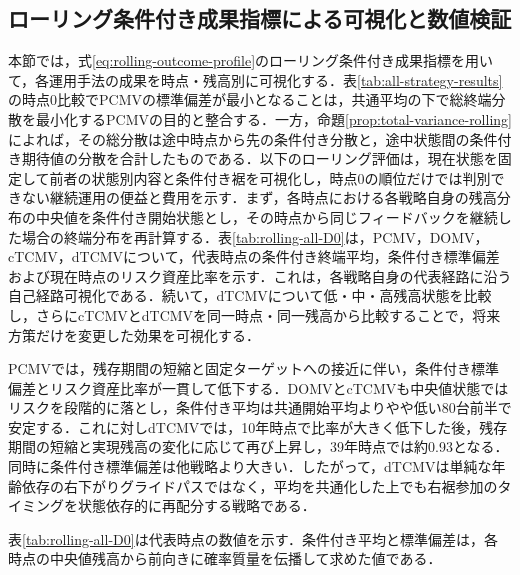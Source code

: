 \documentclass[10pt,a4paper]{article}
\theoremstyle{plain}
\theoremstyle{definition}
\begin{document}
\subsection{ローリング条件付き成果指標による可視化と数値検証}
\label{sec:rolling-results}

本節では，式\eqref{eq:rolling-outcome-profile}のローリング条件付き成果指標を用いて，各運用手法の成果を時点・残高別に可視化する．表\ref{tab:all-strategy-results}の時点0比較でPCMVの標準偏差が最小となることは，共通平均の下で総終端分散を最小化するPCMVの目的と整合する．一方，命題\ref{prop:total-variance-rolling}によれば，その総分散は途中時点から先の条件付き分散と，途中状態間の条件付き期待値の分散を合計したものである．以下のローリング評価は，現在状態を固定して前者の状態別内容と条件付き裾を可視化し，時点0の順位だけでは判別できない継続運用の便益と費用を示す．まず，各時点における各戦略自身の残高分布の中央値を条件付き開始状態とし，その時点から同じフィードバックを継続した場合の終端分布を再計算する．表\ref{tab:rolling-all-D0}は，PCMV，DOMV，cTCMV，dTCMVについて，代表時点の条件付き終端平均，条件付き標準偏差および現在時点のリスク資産比率を示す．これは，各戦略自身の代表経路に沿う自己経路可視化である．続いて，dTCMVについて低・中・高残高状態を比較し，さらにcTCMVとdTCMVを同一時点・同一残高から比較することで，将来方策だけを変更した効果を可視化する．

PCMVでは，残存期間の短縮と固定ターゲットへの接近に伴い，条件付き標準偏差とリスク資産比率が一貫して低下する．DOMVとcTCMVも中央値状態ではリスクを段階的に落とし，条件付き平均は共通開始平均よりやや低い80台前半で安定する．これに対しdTCMVでは，10年時点で比率が大きく低下した後，残存期間の短縮と実現残高の変化に応じて再び上昇し，39年時点では約0.93となる．同時に条件付き標準偏差は他戦略より大きい．したがって，dTCMVは単純な年齢依存の右下がりグライドパスではなく，平均を共通化した上でも右裾参加のタイミングを状態依存的に再配分する戦略である．

表\ref{tab:rolling-all-D0}は代表時点の数値を示す．条件付き平均と標準偏差は，各時点の中央値残高から前向きに確率質量を伝播して求めた値である．
\end{document}
